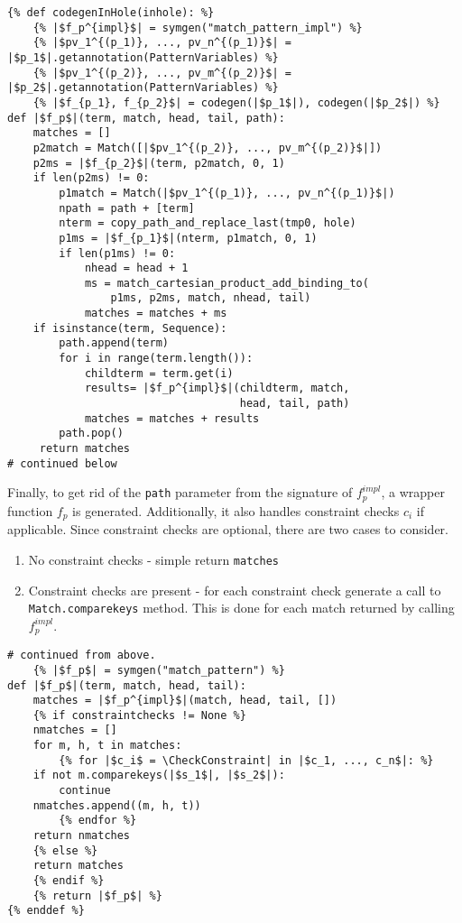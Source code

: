 \begin{verbatim}
{% def codegenInHole(inhole): %}
	{% |$f_p^{impl}$| = symgen("match_pattern_impl") %}
	{% |$pv_1^{(p_1)}, ..., pv_n^{(p_1)}$| = |$p_1$|.getannotation(PatternVariables) %}
	{% |$pv_1^{(p_2)}, ..., pv_m^{(p_2)}$| = |$p_2$|.getannotation(PatternVariables) %}
	{% |$f_{p_1}, f_{p_2}$| = codegen(|$p_1$|), codegen(|$p_2$|) %}
def |$f_p$|(term, match, head, tail, path):
	matches = []
	p2match = Match([|$pv_1^{(p_2)}, ..., pv_m^{(p_2)}$|])
	p2ms = |$f_{p_2}$|(term, p2match, 0, 1)
	if len(p2ms) != 0:
		p1match = Match(|$pv_1^{(p_1)}, ..., pv_n^{(p_1)}$|)
		npath = path + [term]
		nterm = copy_path_and_replace_last(tmp0, hole)
		p1ms = |$f_{p_1}$|(nterm, p1match, 0, 1)
		if len(p1ms) != 0:
			nhead = head + 1
			ms = match_cartesian_product_add_binding_to(
				p1ms, p2ms, match, nhead, tail)
			matches = matches + ms
	if isinstance(term, Sequence):
		path.append(term)
		for i in range(term.length()):
			childterm = term.get(i)
			results= |$f_p^{impl}$|(childterm, match, 
								    head, tail, path)
			matches = matches + results 
		path.pop()
	 return matches 
# continued below
\end{verbatim} 

Finally, to get rid of the \texttt{path} parameter from the signature of $f_p^{impl}$, a wrapper function $f_p$ is generated. Additionally, it also handles constraint checks $c_i$ if applicable. Since constraint checks are optional, there are two cases to consider.

\begin{enumerate}
\item No constraint checks - simple return \texttt{matches}
\item Constraint checks are present - for each constraint check generate a call to \texttt{Match.comparekeys} method. This is done for each match returned by calling $f_p^{impl}$.
\end{enumerate}

\begin{verbatim}
# continued from above.
	{% |$f_p$| = symgen("match_pattern") %}
def |$f_p$|(term, match, head, tail):
	matches = |$f_p^{impl}$|(match, head, tail, [])
	{% if constraintchecks != None %}
	nmatches = []
	for m, h, t in matches:
		{% for |$c_i$ = \CheckConstraint| in |$c_1, ..., c_n$|: %}
	if not m.comparekeys(|$s_1$|, |$s_2$|):
		continue
	nmatches.append((m, h, t))
		{% endfor %}
	return nmatches
	{% else %}
	return matches
	{% endif %}
	{% return |$f_p$| %}
{% enddef %}
\end{verbatim} 

